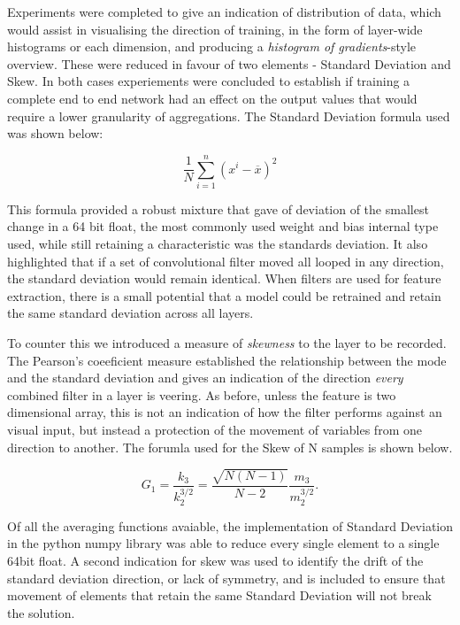 Experiments were completed to give an indication of distribution of data, which would assist in visualising the direction of training, in the form of layer-wide histograms or each dimension, and producing a \textit{histogram of gradients}-style overview. These were reduced in favour of two elements - Standard Deviation and Skew. In both cases experiements were concluded to establish if training a complete end to end network had an effect on the output values that would require a lower granularity of aggregations. The Standard Deviation formula used was shown below:

\begin{equation}
    \label{eqn:stdev}
    \frac1N\sum_{i=1}^n\left(x^i-\overline x\right)^2
\end{equation}

This formula provided a robust mixture that gave of deviation of the smallest change in a 64 bit float, the most commonly used weight and bias internal type used, while still retaining a characteristic was the standards deviation. It also highlighted that if a set of convolutional filter moved all looped in any direction, the standard deviation would remain identical. When filters are used for feature extraction, there is a small potential that a model could be retrained and retain the same standard deviation across all layers.

To counter this we introduced a measure of \textit{skewness} to the layer to be recorded. The Pearson's coeeficient measure established the relationship between the mode and the standard deviation and gives an indication of the direction \textit{every} combined filter in a layer is veering. As before, unless the feature is two dimensional array, this is not an indication of how the filter performs against an visual input, but instead a protection of the movement of variables from one direction to another. The forumla used for the Skew of N samples is shown below. 

\begin{equation}
    \label{eqn:skew}
    G_1=\frac{k_3}{k_2^{3/2}}=\frac{\sqrt{N(N-1)}}{N-2}\frac{m_3}{m_2^{3/2}}.
\end{equation}


Of all the averaging functions avaiable, the implementation of Standard Deviation in the python numpy library was able to reduce every single element to a single 64bit float. A second indication for skew was used to identify the drift of the standard deviation direction, or lack of symmetry,  and is included to ensure that movement of elements that retain the same Standard Deviation will not break the solution.

